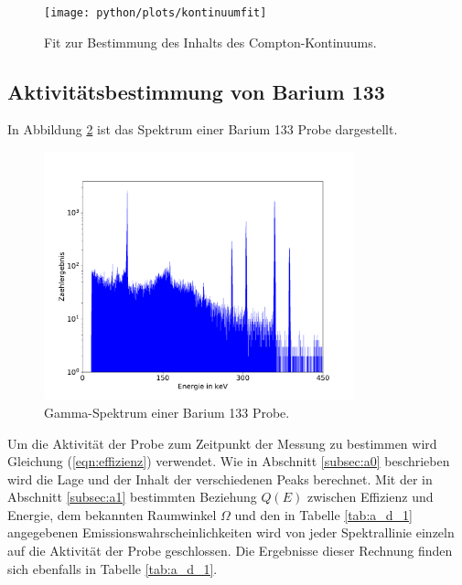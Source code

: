 \begin{figure}
  \texttt{[image: python/plots/kontinuumfit]}
  \caption{Fit zur Bestimmung des Inhalts des Compton-Kontinuums.}
  \label{fig:kontinuumplot}
\end{figure}

\FloatBarrier
\subsection{Aktivitätsbestimmung von Barium 133}
\label{subsec:a3}
In Abbildung \ref{fig:Spektrum_Barium} ist das Spektrum einer Barium 133 Probe dargestellt.
\begin{figure}
\centering
\includegraphics[width=0.8\textwidth]{python/plots/spec3.pdf}
\caption{Gamma-Spektrum einer Barium 133 Probe.}
\label{fig:Spektrum_Barium}
\end{figure}
Um die Aktivität der Probe zum Zeitpunkt der Messung zu bestimmen wird Gleichung (\ref{eqn:effizienz}) verwendet.
Wie in Abschnitt \ref{subsec:a0} beschrieben wird die Lage und der Inhalt der verschiedenen Peaks berechnet.
Mit der in Abschnitt \ref{subsec:a1} bestimmten Beziehung $Q(E)$ zwischen Effizienz und Energie, dem bekannten Raumwinkel $\Omega$ und den in Tabelle \ref{tab:a_d_1} angegebenen Emissionswahrscheinlichkeiten wird von jeder Spektrallinie einzeln auf die Aktivität der Probe geschlossen.
Die Ergebnisse dieser Rechnung finden sich ebenfalls in Tabelle \ref{tab:a_d_1}.
